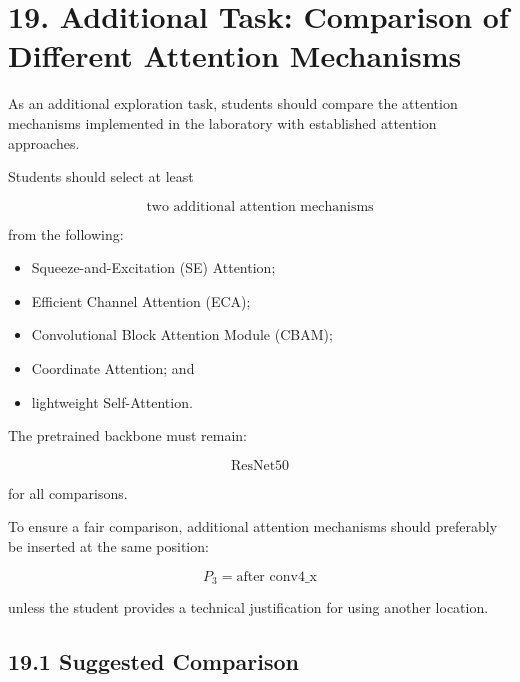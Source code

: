 \documentclass[10pt]{article}
\begin{document}
\section*{19. Additional Task: Comparison of Different Attention Mechanisms}

As an additional exploration task, students should compare the attention
mechanisms implemented in the laboratory with established attention
approaches.

Students should select at least

\[
\boxed{\text{two additional attention mechanisms}}
\]

from the following:

\begin{itemize}

\item Squeeze-and-Excitation (SE) Attention;

\item Efficient Channel Attention (ECA);

\item Convolutional Block Attention Module (CBAM);

\item Coordinate Attention; and

\item lightweight Self-Attention.

\end{itemize}

The pretrained backbone must remain:

\[
\boxed{\text{ResNet50}}
\]

for all comparisons.

To ensure a fair comparison, additional attention mechanisms should
preferably be inserted at the same position:

\[
\boxed{
P_3=\text{after conv4\_x}
}
\]

unless the student provides a technical justification for using another
location.

\subsection*{19.1 Suggested Comparison}
\end{document}
